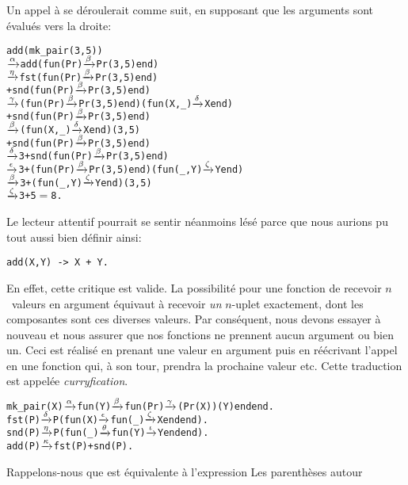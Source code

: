 Un appel à  se déroulerait comme suit, en supposant que
les arguments sont évalués vers la droite:
\begin{alltt}
add(mk\_pair(3,5))
  \(\smashedrightarrow{\alpha}\) add(fun(Pr) \(\smashedrightarrow{\beta}\) Pr(3,5) end)
  \(\smashedrightarrow{\eta}\)   fst(fun(Pr) \(\smashedrightarrow{\beta}\) Pr(3,5) end)
     + snd(fun(Pr) \(\smashedrightarrow{\beta}\) Pr(3,5) end)
  \(\smashedrightarrow{\gamma}\)   (fun(Pr) \(\smashedrightarrow{\beta}\) Pr(3,5) end)(fun(X,\_) \(\smashedrightarrow{\delta}\) X end)
     + snd(fun(Pr) \(\smashedrightarrow{\beta}\) Pr(3,5) end)
  \(\smashedrightarrow{\beta}\)   (fun(X,\_) \(\smashedrightarrow{\delta}\) X end)(3,5)
     + snd(fun(Pr) \(\smashedrightarrow{\beta}\) Pr(3,5) end)
  \(\smashedrightarrow{\delta}\) 3 + snd(fun(Pr) \(\smashedrightarrow{\beta}\) Pr(3,5) end)
  \(\smashedrightarrow{\epsilon}\) 3 + (fun(Pr) \(\smashedrightarrow{\beta}\) Pr(3,5) end)(fun(\_,Y) \(\smashedrightarrow{\zeta}\) Y end)
  \(\smashedrightarrow{\beta}\) 3 + (fun(\_,Y) \(\smashedrightarrow{\zeta}\) Y end)(3,5)
  \(\smashedrightarrow{\zeta}\) 3 + 5 \(=\) 8.
\end{alltt}
Le lecteur attentif pourrait se sentir néanmoins lésé parce que nous
aurions pu tout aussi bien définir  ainsi:
\begin{verbatim}
add(X,Y) -> X + Y.
\end{verbatim}
En effet, cette critique est valide. La possibilité pour une fonction
de recevoir \(n\)~valeurs en argument équivaut à recevoir \emph{un}
\(n\)-uplet exactement, dont les composantes sont ces diverses
valeurs. Par conséquent, nous devons essayer à nouveau et nous assurer
que nos fonctions ne prennent aucun argument ou bien un. Ceci est
réalisé en prenant une valeur en argument puis en réécrivant l'appel
en une fonction qui, à son tour, prendra la prochaine valeur
etc. Cette traduction est appelée \emph{curryfication}.
\begin{alltt}
mk\_pair(X) \(\smashedrightarrow{\alpha}\) fun(Y) \(\smashedrightarrow{\beta}\) fun(Pr) \(\smashedrightarrow{\gamma}\) (Pr(X))(Y) end end.
fst(P) \(\smashedrightarrow{\delta}\) P(fun(X) \(\smashedrightarrow{\epsilon}\) fun(\_) \(\smashedrightarrow{\zeta}\) X end end).
snd(P) \(\smashedrightarrow{\eta}\) P(fun(\_) \(\smashedrightarrow{\theta}\) fun(Y) \(\smashedrightarrow{\iota}\) Y end end).
add(P) \(\smashedrightarrow{\kappa}\) fst(P) + snd(P).
\end{alltt}
Rappelons-nous que  est équivalente à
l'expression  Les parenthèses autour
